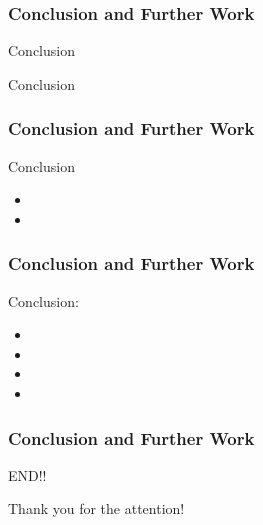 
\begin{frame}
	\frametitle{Conclusion and Further Work}
	\addtocounter{nframe}{1}
	\begin{block}{Conclusion}
		
	\end{block}
	\begin{block}{Conclusion}
		
	\end{block}
\end{frame}


\begin{frame}
	\frametitle{Conclusion and Further Work}
	\addtocounter{nframe}{1}
	\begin{block}{Conclusion}
		\begin{itemize}
			\item 
			\item 
		\end{itemize}
	\end{block}
\end{frame}


\begin{frame}
	\frametitle{Conclusion and Further Work}
	\addtocounter{nframe}{1}
	\begin{block}{Conclusion:}
		\begin{itemize}
			\item<1-> 
			\item<2-> 
			\item<3-> 
			\item<4-> 
		\end{itemize}
	\end{block}
\end{frame}



\begin{frame}
	\frametitle{Conclusion and Further Work}
	\addtocounter{nframe}{1}
	\begin{block}{END!!}
		\begin{center}
			Thank you for the attention!
		\end{center}
	\end{block}
\end{frame}

